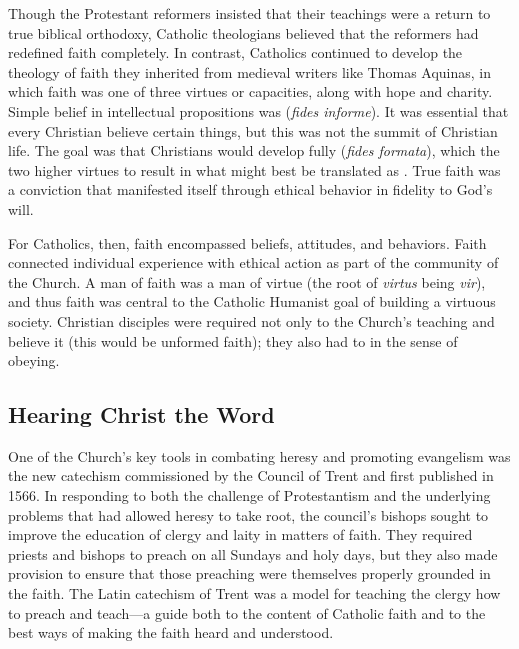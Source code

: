 Though the Protestant reformers insisted that their teachings were a return to
true biblical orthodoxy, Catholic theologians believed that the reformers had
redefined faith completely.  
In contrast, Catholics continued to develop the theology of faith they inherited
from medieval writers like Thomas Aquinas, in which faith was one of three
virtues or capacities, along with hope and charity.%
\Autocite[130--132]{Schreiner:Certainty}
Simple belief in intellectual propositions was 
(\emph{fides informe}).%
    \Autocite[]{Catholic:Catechismus1614}
It was essential that every Christian believe certain things, but this was not
the summit of Christian life.  
The goal was that Christians would develop fully 
(\emph{fides formata}), which  the two higher virtues to
result in  what might best be translated as .
True faith was a conviction that manifested itself through ethical behavior in
fidelity to God's will.

For Catholics, then, faith encompassed beliefs, attitudes, and behaviors.  
Faith connected individual experience with ethical action as part of the
community of the Church.
A man of faith was a man of virtue (the root of \emph{virtus} being \emph{vir}),
and thus faith was central to the Catholic Humanist goal of building a virtuous
society.  
Christian disciples were required not only to  the Church's
teaching and believe it (this would be unformed faith); they also had to
 in the sense of obeying.


\subsection{Hearing Christ the Word}

One of the Church's key tools in combating heresy and promoting evangelism was
the new catechism  commissioned by the Council of
Trent and first published in 1566.%
    \Autocites[]{Catholic:Catechismus1614}{NewCatholic}
In responding to both the challenge of Protestantism and the underlying problems
that had allowed heresy to take root, the council's bishops sought to improve
the education of clergy and laity in matters of faith.%
    \Autocite[]{NewCatholic}
They required priests and bishops to preach on all Sundays and holy days, but
they also made provision to ensure that those preaching were themselves properly
grounded in the faith.  
The Latin catechism of Trent was a model for teaching the clergy how to preach
and teach---a guide both to the content of Catholic faith and to the best ways
of making the faith heard and understood.

